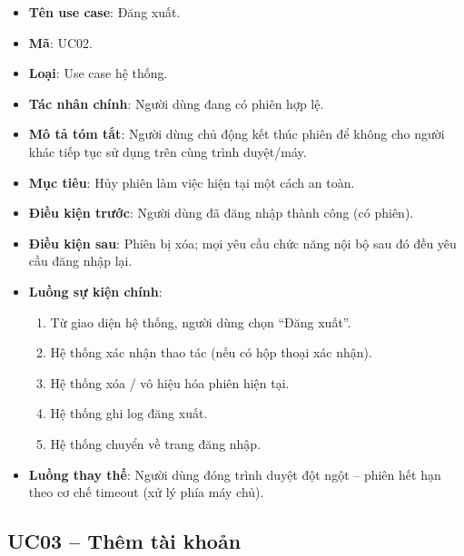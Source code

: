 \begin{itemize}[leftmargin=1.5cm]
    \item \textbf{Tên use case}: Đăng xuất.
    \item \textbf{Mã}: UC02.
    \item \textbf{Loại}: Use case hệ thống.
    \item \textbf{Tác nhân chính}: Người dùng đang có phiên hợp lệ.
    \item \textbf{Mô tả tóm tắt}: Người dùng chủ động kết thúc phiên để không cho người khác tiếp tục sử dụng trên cùng trình duyệt/máy.
    \item \textbf{Mục tiêu}: Hủy phiên làm việc hiện tại một cách an toàn.
    \item \textbf{Điều kiện trước}: Người dùng đã đăng nhập thành công (có phiên).
    \item \textbf{Điều kiện sau}: Phiên bị xóa; mọi yêu cầu chức năng nội bộ sau đó đều yêu cầu đăng nhập lại.
    \item \textbf{Luồng sự kiện chính}:
    \begin{enumerate}
        \item Từ giao diện hệ thống, người dùng chọn ``Đăng xuất''.
        \item Hệ thống xác nhận thao tác (nếu có hộp thoại xác nhận).
        \item Hệ thống xóa / vô hiệu hóa phiên hiện tại.
        \item Hệ thống ghi log đăng xuất.
        \item Hệ thống chuyển về trang đăng nhập.
    \end{enumerate}
    \item \textbf{Luồng thay thế}: Người dùng đóng trình duyệt đột ngột -- phiên hết hạn theo cơ chế timeout (xử lý phía máy chủ).
\end{itemize}

\subsection{UC03 -- Thêm tài khoản}

